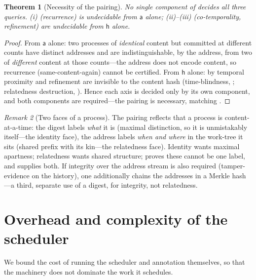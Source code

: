 \documentclass[twocolumn,10pt,a4paper]{article}
\theoremstyle{thmstyle}
\newtheorem{theorem}{Theorem}[section]
\theoremstyle{definition}
\theoremstyle{remark}
\newtheorem{remark}[theorem]{Remark}
\newcommand{\Addr}{\mathsf{a}}
\newcommand{\dig}{\mathsf{h}}
\begin{document}
\begin{theorem}[Necessity of the pairing]
\label{thm:necessity}
No single component of  decides all three queries.
(i) (recurrence) is undecidable from $\Addr$ alone;
(ii)--(iii) (co-temporality, refinement) are
undecidable from $\dig$ alone.
\end{theorem}

\begin{proof}
From $\Addr$ alone: two processes of \emph{identical} content but
committed at different counts have distinct addresses and are
indistinguishable, by the address, from two of \emph{different} content at
those counts---the address does not encode content, so recurrence
(same-content-again) cannot be certified. From $\dig$ alone: by
 temporal proximity and refinement are invisible to
the content hash (time-blindness, ; relatedness
destruction, ). Hence each axis is decided only by
its own component, and both components are required---the pairing is
necessary, matching .
\end{proof}

\begin{remark}[Two faces of a process]
\label{rem:two-faces}
The pairing reflects that a process is content-at-a-time: the digest
labels \emph{what} it is (maximal distinction, so it is unmistakably
itself---the identity face), the address labels \emph{when and where} in
the work-tree it sits (shared prefix with its kin---the relatedness
face). Identity wants maximal apartness; relatedness wants shared
structure;  proves these cannot be one label, and
 supplies both. If integrity over the address stream is
also required (tamper-evidence on the history), one additionally chains
the addresses in a Merkle hash \citep{merkle1988,damgaard1989}---a third,
separate use of a digest, for integrity, not relatedness.
\end{remark}

\section{Overhead and complexity of the scheduler}
\label{sec:overhead}

We bound the cost of running the scheduler and annotation themselves, so
that the machinery does not dominate the work it schedules.
\end{document}
